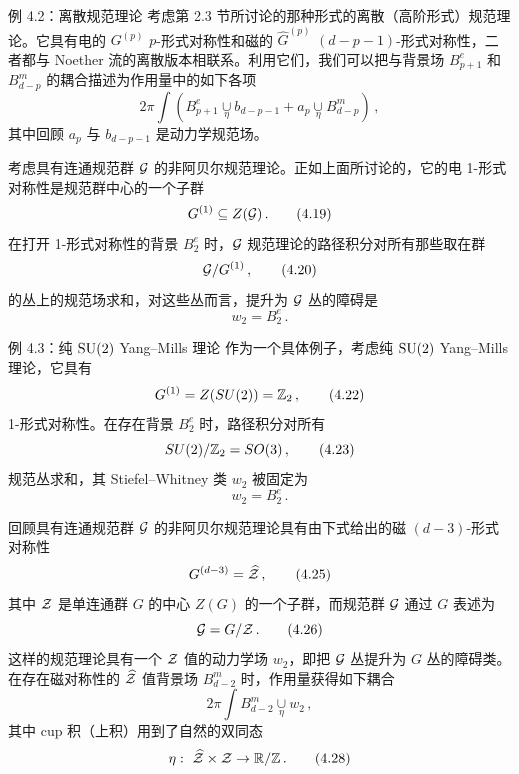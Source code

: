 \begin{examplebox}{例 4.2：离散规范理论}
考虑第 2.3 节所讨论的那种形式的离散（高阶形式）规范理论。它具有电的 $G^{(p)}$ $p$-形式对称性和磁的 $\widehat{G}^{(p)}$ $(d-p-1)$-形式对称性，二者都与 Noether 流的离散版本相联系。利用它们，我们可以把与背景场 $B^e_{p+1}$ 和 $B^m_{d-p}$ 的耦合描述为作用量中的如下各项
\begin{equation}
  2\pi\int\left(B^e_{p+1}\underset{\eta}{\cup}b_{d-p-1}+a_p\underset{\eta}{\cup}B^m_{d-p}\right)\,, \tag{4.18}
\end{equation}
其中回顾 $a_p$ 与 $b_{d-p-1}$ 是动力学规范场。
\end{examplebox}

 考虑具有连通规范群 $\mathcal{G}$ 的非阿贝尔规范理论。正如上面所讨论的，它的电 1-形式对称性是规范群中心的一个子群
\begin{equation}
  G^{(1)}\subseteq Z(\mathcal{G})\,. \tag{4.19}
\end{equation}
在打开 1-形式对称性的背景 $B^e_2$ 时，$\mathcal{G}$ 规范理论的路径积分对所有那些取在群
\begin{equation}
  \mathcal{G}/G^{(1)}\,, \tag{4.20}
\end{equation}
的丛上的规范场求和，对这些丛而言，提升为 $\mathcal{G}$ 丛的障碍是
\begin{equation}
  w_2=B^e_2\,. \tag{4.21}
\end{equation}

\begin{examplebox}{例 4.3：纯 $\mathrm{SU}(2)$ Yang--Mills 理论}
作为一个具体例子，考虑纯 $\mathrm{SU}(2)$ Yang--Mills 理论，它具有
\begin{equation}
  G^{(1)}=Z(SU(2))=\mathbb{Z}_2\,, \tag{4.22}
\end{equation}
1-形式对称性。在存在背景 $B^e_2$ 时，路径积分对所有
\begin{equation}
  SU(2)/\mathbb{Z}_2=SO(3)\,, \tag{4.23}
\end{equation}
规范丛求和，其 Stiefel--Whitney 类 $w_2$ 被固定为
\begin{equation}
  w_2=B^e_2\,. \tag{4.24}
\end{equation}
\end{examplebox}

 回顾具有连通规范群 $\mathcal{G}$ 的非阿贝尔规范理论具有由下式给出的磁 $(d-3)$-形式对称性
\begin{equation}
  G^{(d-3)}=\widehat{\mathcal{Z}}\,, \tag{4.25}
\end{equation}
其中 $\mathcal{Z}$ 是单连通群 $G$ 的中心 $Z(G)$ 的一个子群，而规范群 $\mathcal{G}$ 通过 $G$ 表述为
\begin{equation}
  \mathcal{G}=G/\mathcal{Z}\,. \tag{4.26}
\end{equation}
这样的规范理论具有一个 $\mathcal{Z}$ 值的动力学场 $w_2$，即把 $\mathcal{G}$ 丛提升为 $G$ 丛的障碍类。在存在磁对称性的 $\widehat{\mathcal{Z}}$ 值背景场 $B^m_{d-2}$ 时，作用量获得如下耦合
\begin{equation}
  2\pi\int B^m_{d-2}\underset{\eta}{\cup}w_2\,, \tag{4.27}
\end{equation}
其中 cup 积（上积）用到了自然的双同态
\begin{equation}
  \eta:\ \widehat{\mathcal{Z}}\times\mathcal{Z}\to\mathbb{R}/\mathbb{Z}\,. \tag{4.28}
\end{equation}

